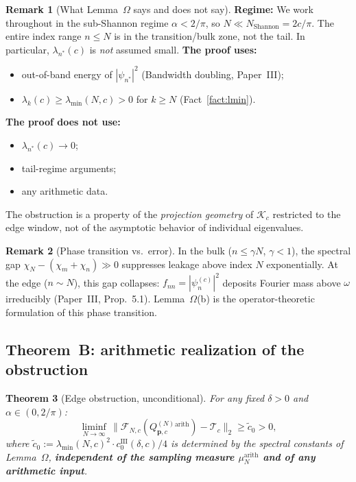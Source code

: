 \documentclass[12pt,a4paper]{amsart}
\newtheorem{theorem}{Theorem}[section]
\theoremstyle{definition}
\newtheorem{remark}[theorem]{Remark}
\newcommand{\Kop}{\mathcal{K}_c}
\newcommand{\QM}{Q^{(N)}_{\mathbf{p},c}}
\newcommand{\psin}{\psi_n^{(c)}}
\newcommand{\norm}[1]{\|#1\|}
\newcommand{\Fcal}{\mathcal{F}_{N,c}}
\newcommand{\Tcal}{\mathcal{T}_c}
\newcommand{\muarith}{\mu^{\mathrm{arith}}_N}
\newcommand{\lmin}{\lambda_{\min}(N,c)}
\begin{document}
\begin{remark}[What Lemma~$\Omega$ says and does not say]%
\label{rem:omega}
\textbf{Regime:}
We work throughout in the sub-Shannon regime $\alpha < 2/\pi$,
so $N \ll N_{\mathrm{Shannon}} = 2c/\pi$. The entire index range
$n \le N$ is in the transition/bulk zone, not the tail.
In particular, $\lambda_{n^*}(c)$ is \emph{not} assumed small.
\textbf{The proof uses:}
\begin{itemize}
  \item out-of-band energy of $|\psi_{n^*}|^2$
  (Bandwidth doubling, Paper~III);
  \item $\lambda_k(c) \ge \lmin > 0$ for $k \ge N$
  (Fact~\ref{fact:lmin}).
\end{itemize}
\textbf{The proof does not use:}
\begin{itemize}
  \item $\lambda_{n^*}(c) \to 0$;
  \item tail-regime arguments;
  \item any arithmetic data.
\end{itemize}
The obstruction is a property of the \emph{projection geometry}
of $\Kop$ restricted to the edge window, not of the asymptotic
behavior of individual eigenvalues.
\end{remark}

\begin{remark}[Phase transition vs.\ error]
In the bulk ($n\le\gamma N$, $\gamma<1$), the spectral gap
$\chi_N-(\chi_m+\chi_n)\gg 0$ suppresses leakage above index $N$
exponentially. At the edge ($n\sim N$), this gap collapses:
$f_{nn} = |\psin|^2$ deposits Fourier mass above $\omega$
irreducibly (Paper~III, Prop.~5.1). Lemma~$\Omega$(b) is the
operator-theoretic formulation of this phase transition.
\end{remark}

\subsection{Theorem~B: arithmetic realization of the obstruction}

\begin{theorem}[Edge obstruction, unconditional]%
\label{thm:edge_obstruction}
For any fixed $\delta > 0$ and $\alpha\in(0,2/\pi)$:
\[
  \liminf_{N\to\infty}\,
  \norm{\Fcal(\QM^{\mathrm{arith}}) - \Tcal}_2
  \ge \tilde c_0 > 0,
\]
where
$\tilde c_0
:= \lmin^2 \cdot c_0^{\mathrm{III}}(\delta,c)/4$
is determined by the spectral constants of Lemma~$\Omega$,
\textbf{independent of the sampling measure $\muarith$ and
of any arithmetic input}.
\end{theorem}
\end{document}
